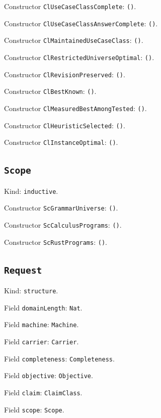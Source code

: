 \documentclass[11pt]{article}
\begin{document}
\noindent Constructor \texttt{ClUseCaseClassComplete}: \texttt{()}.\par
\noindent Constructor \texttt{ClUseCaseClassAnswerComplete}: \texttt{()}.\par
\noindent Constructor \texttt{ClMaintainedUseCaseClass}: \texttt{()}.\par
\noindent Constructor \texttt{ClRestrictedUniverseOptimal}: \texttt{()}.\par
\noindent Constructor \texttt{ClRevisionPreserved}: \texttt{()}.\par
\noindent Constructor \texttt{ClBestKnown}: \texttt{()}.\par
\noindent Constructor \texttt{ClMeasuredBestAmongTested}: \texttt{()}.\par
\noindent Constructor \texttt{ClHeuristicSelected}: \texttt{()}.\par
\noindent Constructor \texttt{ClInstanceOptimal}: \texttt{()}.\par
\subsection*{\texttt{Scope}}
\noindent Kind: \texttt{inductive}.\par
\noindent Constructor \texttt{ScGrammarUniverse}: \texttt{()}.\par
\noindent Constructor \texttt{ScCalculusPrograms}: \texttt{()}.\par
\noindent Constructor \texttt{ScRustPrograms}: \texttt{()}.\par
\subsection*{\texttt{Request}}
\noindent Kind: \texttt{structure}.\par
\noindent Field \texttt{domainLength}: \texttt{Nat}.\par
\noindent Field \texttt{machine}: \texttt{Machine}.\par
\noindent Field \texttt{carrier}: \texttt{Carrier}.\par
\noindent Field \texttt{completeness}: \texttt{Completeness}.\par
\noindent Field \texttt{objective}: \texttt{Objective}.\par
\noindent Field \texttt{claim}: \texttt{ClaimClass}.\par
\noindent Field \texttt{scope}: \texttt{Scope}.\par
\end{document}
